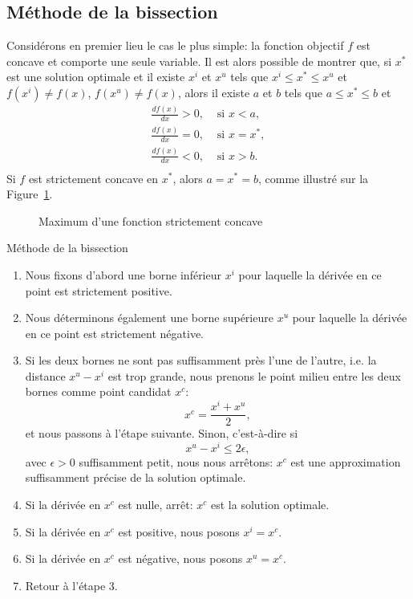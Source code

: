 \subsection{Méthode de la bissection}

Considérons en premier lieu le cas le plus simple: la fonction objectif $f$ est concave et comporte une seule variable.
Il est alors possible de montrer que, si $x^*$ est une solution optimale et il existe $x^i$ et $x^u$ tels que $x^i \leq x^* \leq x^u$ et $f(x^i) \ne f(x)$, $f(x^u) \ne f(x)$, alors il existe $a$ et $b$ tels que $a \leq x^* \leq b$ et
\begin{align*}
\frac{d f(x)}{dx} > 0,& \text{ si } x < a,\\
\frac{d f(x)}{dx} = 0,& \text{ si } x = x^*,\\
\frac{d f(x)}{dx} < 0,& \text{ si } x > b.\\
\end{align*}
Si $f$ est strictement concave en $x^*$, alors $a = x^* = b$, comme illustré sur la Figure~\ref{fig:concavity_maximum}.
\begin{figure}[htb]
\begin{center}
\end{center}
\caption{Maximum d'une fonction strictement concave}
\label{fig:concavity_maximum}
\end{figure}
\begin{algo}{Méthode de la bissection}
\begin{enumerate}
	\item Nous fixons d'abord une borne inférieur $x^i$ pour laquelle la dérivée en ce point est strictement positive.
	\item Nous déterminons également une borne supérieure $x^u$ pour laquelle la dérivée en ce point est strictement négative.
	\item Si les deux bornes ne sont pas suffisamment près l'une de l'autre, i.e. la distance $x^u-x^i$ est trop grande, nous prenons le point milieu entre les deux bornes comme point candidat $x^c$:
	\[
	x^c = \frac{x^i+x^u}{2},
	\]
	et nous passons à l'étape suivante.
	Sinon, c'est-à-dire si
	\[
	x^u-x^i \leq 2\epsilon,
	\]
	avec $\epsilon > 0$ suffisamment petit,	nous nous arrêtons: $x^c$ est une approximation suffisamment précise de la solution optimale.
	\item
	Si la dérivée en $x^c$ est nulle, arrêt: $x^c$ est la solution optimale.
	\item
	Si la dérivée en $x^c$ est positive, nous posons $x^i = x^c$.
	\item
	Si la dérivée en $x^c$ est négative, nous posons $x^u = x^c$.
	\item Retour à l'étape 3.
\end{enumerate}
\end{algo}

